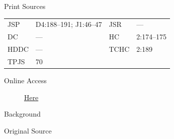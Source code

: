 			\begin{description}
					\item[Print Sources]
				\end{description}

					\begin{tabular}{p{0.5in}p{1in}p{0.5in}p{1in}}
					JSP	 	& D4:188--191; J1:46--47		& JSR 		& --- \\
					DC	 	& --- 		& HC 		& 2:174--175 \\
					HDDC 	& ---		& TCHC 		& 2:189 \\
					TPJS 	& 70			& 	 		&  \\
					\end{tabular}
				
				\begin{description}
					\item[Online Access] \href{https://www.josephsmithpapers.org/paper-summary/covenant-29-november-1834/1}{Here}
				\end{description}
				
				\begin{description}
					\item[Background]
				\end{description}
				
				
				\begin{description}
					\item[Original Source]
				\end{description}
				
					
				
